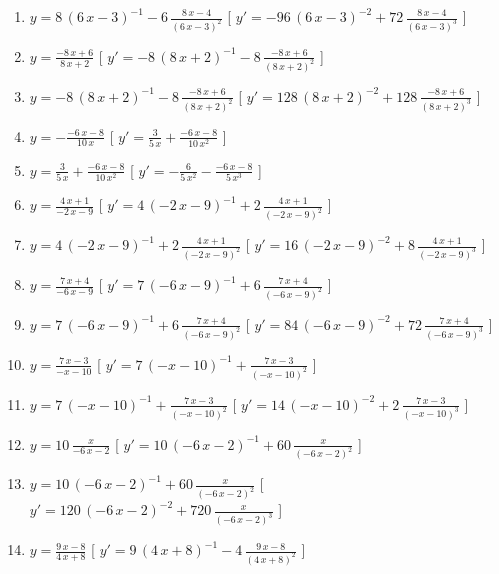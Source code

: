 \begin{esercizio}
\begin{enumerate}
\item $y= 8\, \left( 6\,x-3 \right) ^{-1}-6\,{\frac {8\,x-4}{ \left( 6\,x-3 \right) ^{2}}} $ \hfill [ $y'= -96\, \left( 6\,x-3 \right) ^{-2}+72\,{\frac {8\,x-4}{ \left( 6\,x-3 \right) ^{3}}}$ ]
\item $y= {\frac {-8\,x+6}{8\,x+2}} $ \hfill [ $y'= -8\, \left( 8\,x+2 \right) ^{-1}-8\,{\frac {-8\,x+6}{ \left( 8\,x+2 \right) ^{2}}}$ ]
\item $y= -8\, \left( 8\,x+2 \right) ^{-1}-8\,{\frac {-8\,x+6}{ \left( 8\,x+2 \right) ^{2}}} $ \hfill [ $y'= 128\, \left( 8\,x+2 \right) ^{-2}+128\,{\frac {-8\,x+6}{ \left( 8\,x+2 \right) ^{3}}}$ ]
\item $y= -{\frac {-6\,x-8}{10\,x}} $ \hfill [ $y'= {\frac {3}{5\,x}}+{\frac {-6\,x-8}{10\,{x}^{2}}}$ ]
\item $y= {\frac {3}{5\,x}}+{\frac {-6\,x-8}{10\,{x}^{2}}} $ \hfill [ $y'= -{\frac {6}{5\,{x}^{2}}}-{\frac {-6\,x-8}{5\,{x}^{3}}}$ ]
\item $y= {\frac {4\,x+1}{-2\,x-9}} $ \hfill [ $y'= 4\, \left( -2\,x-9 \right) ^{-1}+2\,{\frac {4\,x+1}{ \left( -2\,x-9 \right) ^{2}}}$ ]
\item $y= 4\, \left( -2\,x-9 \right) ^{-1}+2\,{\frac {4\,x+1}{ \left( -2\,x-9 \right) ^{2}}} $ \hfill [ $y'= 16\, \left( -2\,x-9 \right) ^{-2}+8\,{\frac {4\,x+1}{ \left( -2\,x-9 \right) ^{3}}}$ ]
\item $y= {\frac {7\,x+4}{-6\,x-9}} $ \hfill [ $y'= 7\, \left( -6\,x-9 \right) ^{-1}+6\,{\frac {7\,x+4}{ \left( -6\,x-9 \right) ^{2}}}$ ]
\item $y= 7\, \left( -6\,x-9 \right) ^{-1}+6\,{\frac {7\,x+4}{ \left( -6\,x-9 \right) ^{2}}} $ \hfill [ $y'= 84\, \left( -6\,x-9 \right) ^{-2}+72\,{\frac {7\,x+4}{ \left( -6\,x-9 \right) ^{3}}}$ ]
\item $y= {\frac {7\,x-3}{-x-10}} $ \hfill [ $y'= 7\, \left( -x-10 \right) ^{-1}+{\frac {7\,x-3}{ \left( -x-10 \right) ^{2}}}$ ]
\item $y= 7\, \left( -x-10 \right) ^{-1}+{\frac {7\,x-3}{ \left( -x-10 \right) ^{2}}} $ \hfill [ $y'= 14\, \left( -x-10 \right) ^{-2}+2\,{\frac {7\,x-3}{ \left( -x-10 \right) ^{3}}}$ ]
\item $y= 10\,{\frac {x}{-6\,x-2}} $ \hfill [ $y'= 10\, \left( -6\,x-2 \right) ^{-1}+60\,{\frac {x}{ \left( -6\,x-2 \right) ^{2}}}$ ]
\item $y= 10\, \left( -6\,x-2 \right) ^{-1}+60\,{\frac {x}{ \left( -6\,x-2 \right) ^{2}}} $ \hfill [ $y'= 120\, \left( -6\,x-2 \right) ^{-2}+720\,{\frac {x}{ \left( -6\,x-2 \right) ^{3}}}$ ]
\item $y= {\frac {9\,x-8}{4\,x+8}} $ \hfill [ $y'= 9\, \left( 4\,x+8 \right) ^{-1}-4\,{\frac {9\,x-8}{ \left( 4\,x+8 \right) ^{2}}}$ ]

\end{enumerate}
\end{esercizio}
